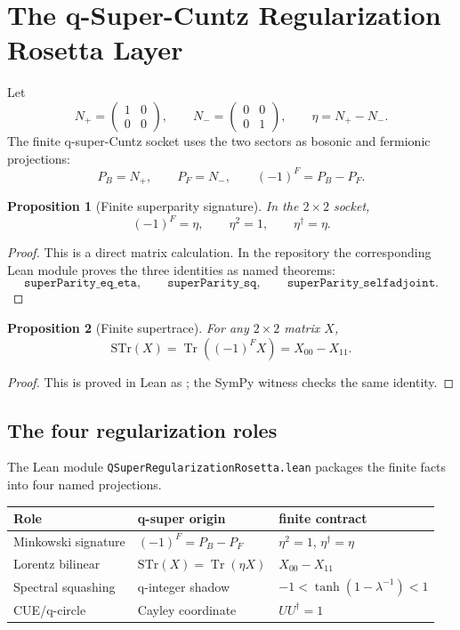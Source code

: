\documentclass[11pt]{article}
\newtheorem{proposition}{Proposition}
\newcommand{\STr}{\mathrm{STr}}
\begin{document}
\section{The q-Super-Cuntz Regularization Rosetta Layer}

Let
\[
  N_+ =
  \begin{pmatrix}
  1&0\\0&0
  \end{pmatrix},
  \qquad
  N_- =
  \begin{pmatrix}
  0&0\\0&1
  \end{pmatrix},
  \qquad
  \eta=N_+-N_-.
\]
The finite q-super-Cuntz socket uses the two sectors as bosonic and fermionic
projections:
\[
  P_B=N_+,\qquad P_F=N_-,\qquad (-1)^F=P_B-P_F.
\]

\begin{proposition}[Finite superparity signature]
In the \(2\times2\) socket,
\[
  (-1)^F=\eta,\qquad \eta^2=1,\qquad \eta^\dagger=\eta.
\]
\end{proposition}

\begin{proof}
This is a direct matrix calculation.  In the repository the corresponding
Lean module proves the three identities as named theorems:
\[
\texttt{superParity\_eq\_eta},\qquad
\texttt{superParity\_sq},\qquad
\texttt{superParity\_selfadjoint}.
\]
\end{proof}

\begin{proposition}[Finite supertrace]
For any \(2\times2\) matrix \(X\),
\[
  \STr(X)=\operatorname{Tr}((-1)^F X)=X_{00}-X_{11}.
\]
\end{proposition}

\begin{proof}
This is proved in Lean as ; the SymPy witness
 checks the same identity.
\end{proof}

\subsection{The four regularization roles}

The Lean module \texttt{QSuperRegularizationRosetta.lean} packages the finite
facts into four named projections.

\begin{center}
\begin{tabular}{lll}
\toprule
Role & q-super origin & finite contract\\
\midrule
Minkowski signature & \((-1)^F=P_B-P_F\) & \(\eta^2=1\), \(\eta^\dagger=\eta\)\\
Lorentz bilinear & \(\STr(X)=\operatorname{Tr}(\eta X)\) & \(X_{00}-X_{11}\)\\
Spectral squashing & q-integer shadow & \(-1<\tanh(1-\lambda^{-1})<1\)\\
CUE/q-circle & Cayley coordinate & \(U U^\dagger=1\)\\
\bottomrule
\end{tabular}
\end{center}
\end{document}
